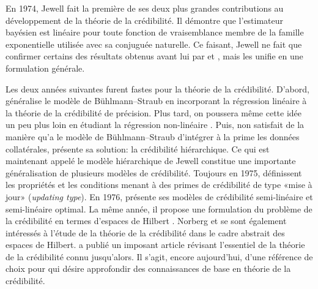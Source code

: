 En 1974, Jewell fait la première de ses deux plus grandes
contributions au développement de la théorie de la crédibilité. Il
démontre \citep{Jewell:exact:1974} que l'estimateur bayésien est
linéaire pour toute fonction de vraisemblance membre de la famille
exponentielle utilisée avec sa conjuguée naturelle. Ce faisant, Jewell
ne fait que confirmer certains des résultats obtenus avant lui par
\citet{Bailey:1950} et \citet{Mayerson:bayesian:1964}, mais les unifie
en une formulation générale.

Les deux années suivantes furent fastes pour la théorie de la
crédibilité. D'abord, \citet{Hachemeister:1975} généralise le modèle de
Bühlmann--Straub en incorporant la régression linéaire à la théorie de
la crédibilité de précision. Plus tard, on poussera même cette idée un
peu plus loin en étudiant la régression non-linéaire
\citep{DeVylder:non-linear:1985}. Puis, non satisfait de la manière
qu'a le modèle de Bühlmann--Straub d'intégrer à la prime les données
collatérales, \citet{Jewell:hierarchical:1975} présente sa solution: la
crédibilité hiérarchique. Ce qui est maintenant appelé le modèle
hiérarchique de Jewell constitue une importante généralisation de
plusieurs modèles de crédibilité. Toujours en 1975,
\citet{Gerber:updating:1975} définissent les propriétés et les
conditions menant à des primes de crédibilité de type «mise à jour»
(\emph{updating type}). En 1976, \citep{DeVylder:semilinear:1976}
présente ses modèles de crédibilité semi-linéaire et semi-linéaire
optimal. La même année, il propose une formulation du problème de la
crédibilité en termes d'espaces de Hilbert
\citep{DeVylder:geometrical:1976}. Norberg et
\citet{Taylor:abstractcredibility:1977} se sont également intéressés à
l'étude de la théorie de la crédibilité dans le cadre abstrait des
espaces de Hilbert. \citet{Norberg:credibility:1979} a publié un imposant
article révisant l'essentiel de la théorie de la crédibilité connu
jusqu'alors. Il s'agit, encore aujourd'hui, d'une référence de choix
pour qui désire approfondir des connaissances de base en théorie de la
crédibilité.

